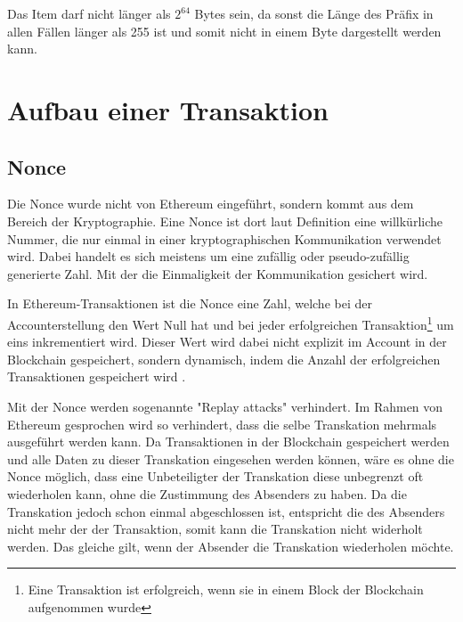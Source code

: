 \documentclass[runningheads]{llncs}
\begin{document}
Das Item darf nicht länger als $2^{64}$ Bytes sein, da sonst die Länge des Präfix in allen Fällen länger als 255 ist und somit nicht in einem Byte dargestellt werden kann.
\section{Aufbau einer Transaktion}

\subsection{Nonce}
\label{nonce}
Die Nonce wurde nicht von Ethereum eingeführt, sondern kommt aus dem Bereich der Kryptographie. Eine Nonce ist dort laut Definition %
eine willkürliche Nummer, die nur einmal in einer kryptographischen Kommunikation verwendet wird. Dabei handelt es sich meistens um eine zufällig oder pseudo-zufällig generierte Zahl. Mit der die Einmaligkeit der Kommunikation gesichert wird.

In Ethereum-Transaktionen ist die Nonce eine Zahl, welche bei der Accounterstellung den Wert Null hat und bei jeder erfolgreichen Transaktion\footnote{Eine Transaktion ist erfolgreich, wenn sie in einem Block der Blockchain aufgenommen wurde} um eins inkrementiert wird. Dieser Wert wird dabei nicht explizit im Account in der Blockchain gespeichert, sondern dynamisch, indem die Anzahl der erfolgreichen Transaktionen gespeichert wird \cite[S.101]{antonopoulos_mastering_2019}.

Mit der Nonce werden sogenannte "Replay attacks" verhindert. Im Rahmen von Ethereum gesprochen wird so verhindert, dass die selbe Transkation mehrmals ausgeführt werden kann. Da Transaktionen in der Blockchain gespeichert werden und alle Daten zu dieser Transkation eingesehen werden können, wäre es ohne die Nonce möglich, dass eine Unbeteiligter der Transkation diese unbegrenzt oft wiederholen kann, ohne die Zustimmung des Absenders zu haben. Da die Transkation jedoch schon einmal abgeschlossen ist, entspricht die des Absenders nicht mehr der der Transaktion, somit kann die Transkation nicht widerholt werden.
Das gleiche gilt, wenn der Absender die Transkation wiederholen möchte.
\end{document}
